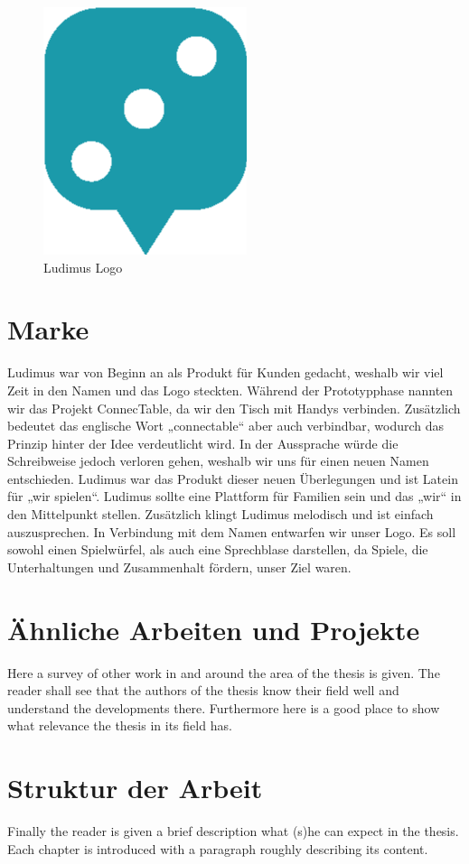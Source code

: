 \begin{figure}
\begin{center}
	\includegraphics[scale=0.3]{images/ludimusLogo.png}
\end{center}
	\caption{Ludimus Logo}
\end{figure}

\section{Marke}
Ludimus war von Beginn an als Produkt für Kunden gedacht, weshalb wir viel Zeit in den Namen und das Logo steckten. Während der Prototypphase nannten wir das Projekt ConnecTable, da wir den Tisch mit Handys verbinden. Zusätzlich bedeutet das englische Wort „connectable“ aber auch verbindbar, wodurch das Prinzip hinter der Idee verdeutlicht wird. In der Aussprache würde die Schreibweise jedoch verloren gehen, weshalb wir uns für einen neuen Namen entschieden. Ludimus war das Produkt dieser neuen Überlegungen und ist Latein für „wir spielen“. Ludimus sollte eine Plattform für Familien sein und das „wir“ in den Mittelpunkt stellen. Zusätzlich klingt Ludimus melodisch und ist einfach auszusprechen. In Verbindung mit dem Namen entwarfen wir unser Logo. Es soll sowohl einen Spielwürfel, als auch eine Sprechblase darstellen, da Spiele, die Unterhaltungen und Zusammenhalt fördern, unser Ziel waren. 


\section{Ähnliche Arbeiten und Projekte}
Here a survey of other work in and around the area of the thesis is given. The reader shall see that the authors of the thesis know their field well and understand the developments there. Furthermore here is a good place to show what relevance the thesis in its field has.

\section{Struktur der Arbeit}
Finally the reader is given a brief description what (s)he can expect in the thesis. Each chapter is introduced with a paragraph roughly describing its content.